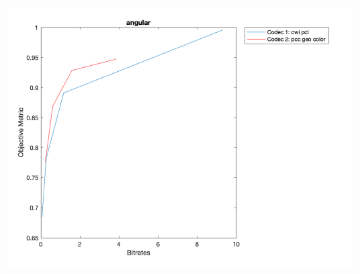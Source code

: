\documentclass{article}
\begin{document}
\begin{figure}
    \begin{subfigure}[b]{0.65\textwidth}
    \includegraphics[width=\textwidth]{Figures/task2/rhetorician_angular.png}
    \end{subfigure}
\end{figure}
\end{document}
